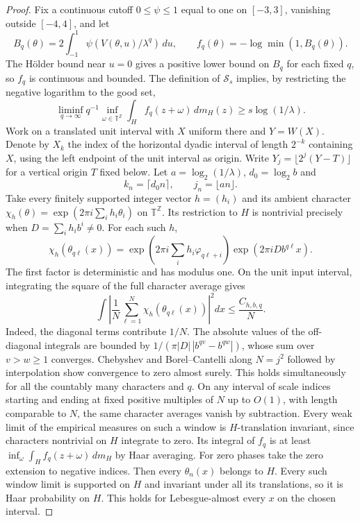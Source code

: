 \documentclass[11pt,a4paper]{article}
\newcommand{\T}{\mathbb T}
\begin{document}
\begin{proof}
Fix a continuous cutoff $0\le\psi\le1$ equal to one on $[-3,3]$, vanishing outside $[-4,4]$, and let
\[
 B_q(\theta)=2\int_{-1}^1\psi(V(\theta,u)/\lambda^q)\,du,
 \qquad f_q(\theta)=-\log\min(1,B_q(\theta)).
\]
The H\"older bound near $u=0$ gives a positive lower bound on $B_q$ for each fixed $q$, so $f_q$ is continuous and bounded. The definition of $\mathcal S_s$ implies, by restricting the negative logarithm to the good set,
\[
 \liminf_{q\to\infty}q^{-1}\inf_{\omega\in\T^{\mathbb Z}}
 \int_{H} f_q(z+\omega)\,dm_{H}(z)\ge s\log(1/\lambda).\tag{G1}
\]
Work on a translated unit interval with $X$ uniform there and $Y=W(X)$. Denote by $X_k$ the index of the horizontal dyadic interval of length $2^{-k}$ containing $X$, using the left endpoint of the unit interval as origin. Write $Y_j=\lfloor2^j(Y-T)\rfloor$ for a vertical origin $T$ fixed below. Let $a=\log_2(1/\lambda)$, $d_0=\log_2 b$ and
\[
 k_n=\lceil d_0 n\rceil,\qquad j_n=\lfloor a n\rfloor .
\]
Take every finitely supported integer vector $h=(h_i)$ and its
ambient character $\chi_h(\theta)=\exp(2\pi i\sum_i h_i\theta_i)$
on $\T^{\mathbb Z}$. Its restriction to $H$ is nontrivial precisely
when $D=\sum_i h_i b^i\ne0$. For each such $h$,
\[
 \chi_h(\theta_{q\ell}(x))
  = \exp\!\left(2\pi i\sum_i h_i\varphi_{q\ell+i}\right)
    \exp(2\pi i D b^{q\ell}x).
\]
The first factor is deterministic and has modulus one. On the unit input
interval, integrating the square of the full character average gives
\[
 \int \left|\frac{1}{N}\sum_{\ell=1}^N \chi_h(\theta_{q\ell}(x))\right|^2
 dx \le \frac{C_{h,b,q}}{N}.
\]
Indeed, the diagonal terms contribute $1/N$. The absolute values of
the off-diagonal integrals are bounded by $1/(\pi|D|\,|b^{qv}-b^{qw}|)$, whose sum over $v>w\ge1$ converges. Chebyshev and Borel--Cantelli along $N=j^2$ followed by interpolation show convergence to zero almost surely. This holds simultaneously for all the countably many characters and $q$. On any interval of scale indices starting and ending at fixed positive multiples of $N$ up to $O(1)$, with length comparable to $N$, the same character averages vanish by subtraction. Every weak limit of the empirical measures on such a window is $H$-translation invariant, since characters nontrivial on $H$ integrate to zero. Its integral of $f_q$ is at least $\inf_\omega\int_H f_q(z+\omega)\,dm_H$ by Haar averaging.
For zero phases take the zero extension to negative indices. Then every
$\theta_n(x)$ belongs to $H$. Every such window limit is supported on
$H$ and invariant under all its translations, so it is Haar probability
on $H$. This holds for Lebesgue-almost every $x$ on the chosen interval.


\end{proof}
\end{document}
